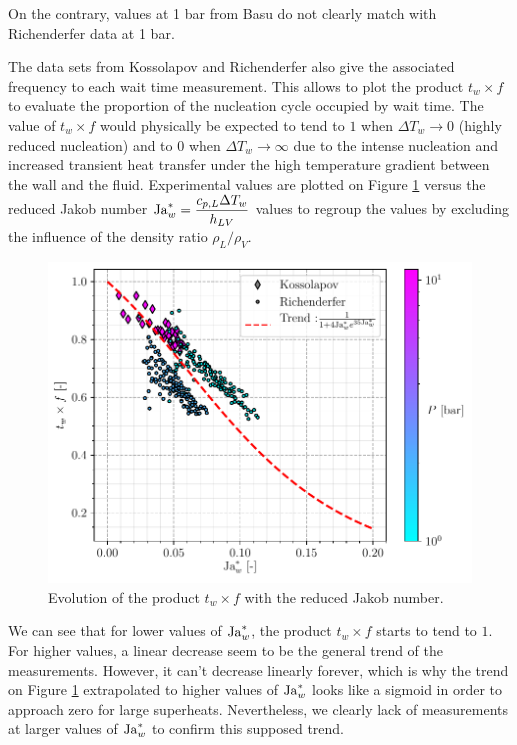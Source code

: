 On the contrary, values at 1 bar from Basu do not clearly match with Richenderfer data at 1 bar.

\npar

The data sets from Kossolapov and Richenderfer also give the associated frequency to each wait time measurement. This allows to plot the product $t_{w} \times f$ to evaluate the proportion of the nucleation cycle occupied by wait time. The value of $t_{w} \times f$ would physically be expected to tend to $1$ when $\Delta T_{w} \to 0$ (highly reduced nucleation) and to $0$ when $\Delta T_{w} \to \infty$ due to the intense nucleation and increased transient heat transfer under the high temperature gradient between the wall and the fluid. Experimental values are plotted on Figure \ref{fig:twf_Jawred} versus the reduced Jakob number $\mathrm{Ja}_{w}^{*} = \dfrac{c_{p,L}\Delta T_{w}}{h_{LV}}$ values to regroup the values by excluding the influence of the density ratio $\rho_{L}/\rho_{V}$.



\begin{figure}[!h]
\centering
\includegraphics[width=0.6\linewidth]{img/tw/Jawred_twf.pdf}
\caption{Evolution of the product $t_{w} \times f$ with the reduced Jakob number.}%
\label{fig:twf_Jawred}
\end{figure}

We can see that for lower values of $\mathrm{Ja}_{w}^{*}$, the product $t_{w} \times f$ starts to tend to $1$. For higher values, a linear decrease seem to be the general trend of the measurements. However, it can't decrease linearly forever, which is why the trend on Figure \ref{fig:twf_Jawred} extrapolated to higher values of $\mathrm{Ja}_{w}^{*}$ looks like a sigmoid in order to approach zero for large superheats. Nevertheless, we clearly lack of measurements at larger values of $\mathrm{Ja}_{w}^{*}$ to confirm this supposed trend.


